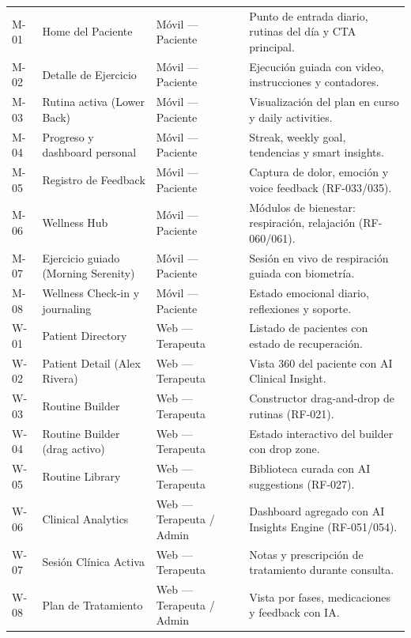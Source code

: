 \begin{longtable}{L{1cm} L{4.5cm} L{2.8cm} L{6.5cm}}
  M-01 & Home del Paciente & Móvil --- Paciente & Punto de entrada diario, rutinas del día y CTA principal. \\
  M-02 & Detalle de Ejercicio & Móvil --- Paciente & Ejecución guiada con video, instrucciones y contadores. \\
  M-03 & Rutina activa (Lower Back) & Móvil --- Paciente & Visualización del plan en curso y daily activities. \\
  M-04 & Progreso y dashboard personal & Móvil --- Paciente & Streak, weekly goal, tendencias y smart insights. \\
  M-05 & Registro de Feedback & Móvil --- Paciente & Captura de dolor, emoción y voice feedback (RF-033/035). \\
  M-06 & Wellness Hub & Móvil --- Paciente & Módulos de bienestar: respiración, relajación (RF-060/061). \\
  M-07 & Ejercicio guiado (Morning Serenity) & Móvil --- Paciente & Sesión en vivo de respiración guiada con biometría. \\
  M-08 & Wellness Check-in y journaling & Móvil --- Paciente & Estado emocional diario, reflexiones y soporte. \\
  W-01 & Patient Directory & Web --- Terapeuta & Listado de pacientes con estado de recuperación. \\
  W-02 & Patient Detail (Alex Rivera) & Web --- Terapeuta & Vista 360 del paciente con AI Clinical Insight. \\
  W-03 & Routine Builder & Web --- Terapeuta & Constructor drag-and-drop de rutinas (RF-021). \\
  W-04 & Routine Builder (drag activo) & Web --- Terapeuta & Estado interactivo del builder con drop zone. \\
  W-05 & Routine Library & Web --- Terapeuta & Biblioteca curada con AI suggestions (RF-027). \\
  W-06 & Clinical Analytics & Web --- Terapeuta / Admin & Dashboard agregado con AI Insights Engine (RF-051/054). \\
  W-07 & Sesión Clínica Activa & Web --- Terapeuta & Notas y prescripción de tratamiento durante consulta. \\
  W-08 & Plan de Tratamiento & Web --- Terapeuta / Admin & Vista por fases, medicaciones y feedback con IA. \\
  \bottomrule
\end{longtable}

